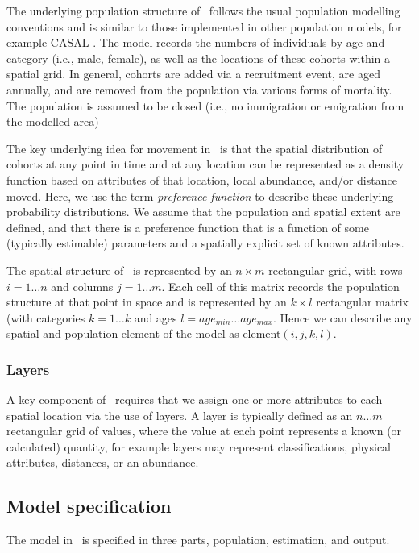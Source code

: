 The underlying population structure of \SPM\ follows the usual population modelling conventions and is similar to those implemented in other population models, for example CASAL \citep{1388}. The model records the numbers of individuals by age and category (i.e., male, female), as well as the locations of these cohorts within a spatial grid. In general, cohorts are added via a recruitment event, are aged annually, and are removed from the population via various forms of mortality. The population is assumed to be closed (i.e., no immigration or emigration from the modelled area)

The key underlying idea for movement in \SPM\ is that the spatial distribution of cohorts at any point in time and at any location can be represented as a density function based on attributes of that location, local abundance, and/or distance moved. Here, we use the term \emph{preference function} to describe these underlying probability distributions. We assume that the population and spatial extent are defined, and that there is a preference function that is a function of some (typically estimable) parameters and a spatially explicit set of known attributes.

The spatial structure of \SPM\ is represented by an $n \times m$ rectangular grid, with rows $i=1 \dots n$ and columns $j=1 \ldots m$. Each cell of this matrix records the population structure at that point in space and is represented by an $k \times l$ rectangular matrix (with categories $k=1 \ldots k$ and ages $l=age_{min} \ldots age_{max}$. Hence we can describe any spatial and population element of the model as element$(i,j,k,l)$. 

\subsubsection{Layers}

A key component of \SPM\ requires that we assign one or more attributes to each spatial location via the use of layers. A layer is typically defined as an $n \ldots m$ rectangular grid of values, where the value at each point represents a known (or calculated) quantity, for example layers may represent classifications, physical attributes, distances, or an abundance. 

\subsection{Model specification}

The model in \SPM\ is specified in three parts, population, estimation, and output. 

